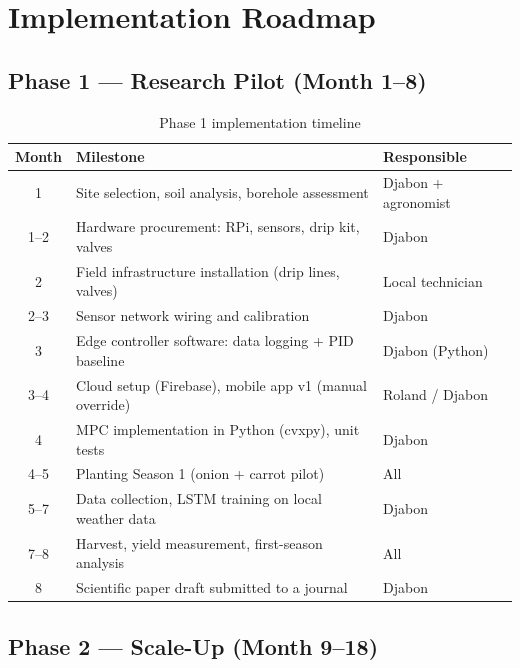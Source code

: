\documentclass[12pt, a4paper]{report}
\begin{document}
\chapter{Implementation Roadmap}

\section{Phase 1 — Research Pilot (Month 1–8)}

\begin{table}[H]
\centering
\caption{Phase 1 implementation timeline}
\label{tab:timeline1}
\renewcommand{\arraystretch}{1.3}
\begin{tabular}{cll}
\toprule
\textbf{Month} & \textbf{Milestone} & \textbf{Responsible}\\
\midrule
1  & Site selection, soil analysis, borehole assessment          & Djabon + agronomist \\
1–2 & Hardware procurement: RPi, sensors, drip kit, valves      & Djabon \\
2  & Field infrastructure installation (drip lines, valves)     & Local technician \\
2–3 & Sensor network wiring and calibration                     & Djabon \\
3  & Edge controller software: data logging + PID baseline      & Djabon (Python) \\
3–4 & Cloud setup (Firebase), mobile app v1 (manual override)   & Roland / Djabon \\
4  & MPC implementation in Python (cvxpy), unit tests           & Djabon \\
4–5 & Planting Season 1 (onion + carrot pilot)                  & All \\
5–7 & Data collection, LSTM training on local weather data      & Djabon \\
7–8 & Harvest, yield measurement, first-season analysis        & All \\
8  & Scientific paper draft submitted to a journal             & Djabon \\
\bottomrule
\end{tabular}
\end{table}

\section{Phase 2 — Scale-Up (Month 9–18)}
\end{document}
